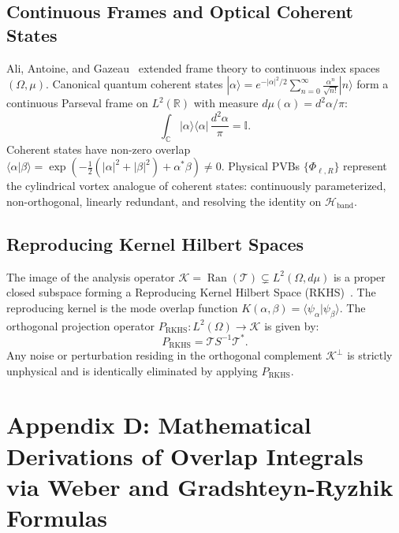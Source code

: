 \documentclass{optica-article}
\begin{document}
\subsection{Continuous Frames and Optical Coherent States}

Ali, Antoine, and Gazeau~\cite{Ali1993,Gazeau2009,Klauder1985,Perelomov1986} extended frame theory to continuous index spaces $(\Omega, \mu)$. Canonical quantum coherent states $|\alpha\rangle = e^{-|\alpha|^2/2} \sum_{n=0}^\infty \frac{\alpha^n}{\sqrt{n!}} |n\rangle$ form a continuous Parseval frame on $L^2(\mathbb{R})$ with measure $d\mu(\alpha) = d^2\alpha / \pi$:
\begin{equation}
\int_{\mathbb{C}} |\alpha\rangle \langle \alpha| \, \frac{d^2\alpha}{\pi} = \mathbb{I}.
\label{eq:app_coherent_resolution}
\end{equation}
Coherent states have non-zero overlap $\langle \alpha | \beta \rangle = \exp(-\frac{1}{2}(|\alpha|^2 + |\beta|^2) + \alpha^* \beta) \neq 0$. Physical PVBs $\{\Phi_{\ell, R}\}$ represent the cylindrical vortex analogue of coherent states: continuously parameterized, non-orthogonal, linearly redundant, and resolving the identity on $\mathcal{H}_{\text{band}}$.

\subsection{Reproducing Kernel Hilbert Spaces}

The image of the analysis operator $\mathcal{K} = \operatorname{Ran}(\mathcal{T}) \subsetneq L^2(\Omega, d\mu)$ is a proper closed subspace forming a Reproducing Kernel Hilbert Space (RKHS)~\cite{PaulsenRaghupathi2016}. The reproducing kernel is the mode overlap function $K(\alpha, \beta) = \langle \psi_\alpha | \psi_\beta \rangle$. The orthogonal projection operator $P_{\text{RKHS}}: L^2(\Omega) \to \mathcal{K}$ is given by:
\begin{equation}
P_{\text{RKHS}} = \mathcal{T} S^{-1} \mathcal{T}^*.
\label{eq:app_rkhs_proj}
\end{equation}
Any noise or perturbation residing in the orthogonal complement $\mathcal{K}^\perp$ is strictly unphysical and is identically eliminated by applying $P_{\text{RKHS}}$.

\section{Appendix D: Mathematical Derivations of Overlap Integrals via Weber and Gradshteyn-Ryzhik Formulas}
\label{app:derivations}
\end{document}
